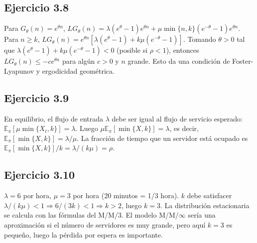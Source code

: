\documentclass[12pt]{article}
\newcommand{\E}{\mathbb{E}}
\newcommand{\1}{\mathbf{1}}
\begin{document}
\subsection{Ejercicio 3.8}
Para $G_\theta(n)=e^{\theta n}$, $LG_\theta(n)=\lambda(e^{\theta}-1)e^{\theta n}+\mu\min\{n,k\}(e^{-\theta}-1)e^{\theta n}$. Para $n\ge k$, $LG_\theta(n)=e^{\theta n}[\lambda(e^{\theta}-1)+k\mu(e^{-\theta}-1)]$. Tomando $\theta>0$ tal que $\lambda(e^{\theta}-1)+k\mu(e^{-\theta}-1)<0$ (posible si $\rho<1$), entonces $LG_\theta(n)\le -c e^{\theta n}$ para alg\'un $c>0$ y $n$ grande. Esto da una condici\'on de Foster-Lyapunov y ergodicidad geom\'etrica.

\subsection{Ejercicio 3.9}
En equilibrio, el flujo de entrada $\lambda$ debe ser igual al flujo de servicio esperado: $\E_\pi[\mu\min\{X_t,k\}]=\lambda$. Luego $\mu\E_\pi[\min\{X,k\}]=\lambda$, es decir, $\E_\pi[\min\{X,k\}]=\lambda/\mu$. La fracci\'on de tiempo que un servidor est\'a ocupado es $\E_\pi[\min\{X,k\}]/k=\lambda/(k\mu)=\rho$.

\subsection{Ejercicio 3.10}
$\lambda=6$ por hora, $\mu=3$ por hora (20 minutos = 1/3 hora). $k$ debe satisfacer $\lambda/(k\mu)<1\Rightarrow 6/(3k)<1\Rightarrow k>2$, luego $k=3$. La distribuci\'on estacionaria se calcula con las f\'ormulas del M/M/3. El modelo M/M/$\infty$ ser\'ia una aproximaci\'on si el n\'umero de servidores es muy grande, pero aqu\'i $k=3$ es peque\~no, luego la p\'erdida por espera es importante.
\end{document}
